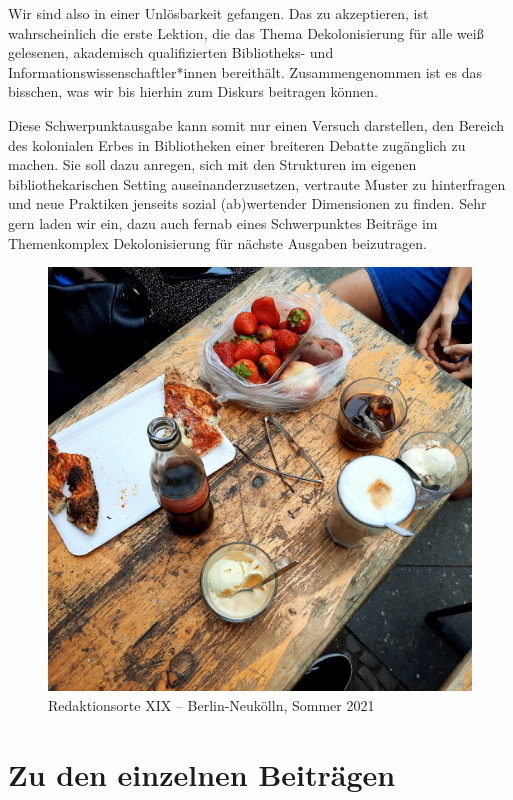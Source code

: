 \documentclass[a4paper,
fontsize=11pt,
oneside,
numbers=noperiodatend,
parskip=half-,
bibliography=totoc,
final
]{scrartcl}
\begin{document}
Wir sind also in einer Unlösbarkeit gefangen. Das zu akzeptieren, ist
wahrscheinlich die erste Lektion, die das Thema Dekolonisierung für alle
weiß gelesenen, akademisch qualifizierten Bibliotheks- und
Informationswissenschaftler*innen bereithält. Zusammengenommen ist es
das bisschen, was wir bis hierhin zum Diskurs beitragen können.

Diese Schwerpunktausgabe kann somit nur einen Versuch darstellen, den
Bereich des kolonialen Erbes in Bibliotheken einer breiteren Debatte
zugänglich zu machen. Sie soll dazu anregen, sich mit den Strukturen im
eigenen bibliothekarischen Setting auseinanderzusetzen, vertraute Muster
zu hinterfragen und neue Praktiken jenseits sozial (ab)wertender
Dimensionen zu finden. Sehr gern laden wir ein, dazu auch fernab eines
Schwerpunktes Beiträge im Themenkomplex Dekolonisierung für nächste
Ausgaben beizutragen.

\begin{figure}
\centering
\includegraphics{img/img1.jpg}
\caption{Redaktionsorte XIX -- Berlin-Neukölln, Sommer 2021}
\end{figure}

\hypertarget{zu-den-einzelnen-beitruxe4gen}{%
\section{Zu den einzelnen
Beiträgen}\label{zu-den-einzelnen-beitruxe4gen}}
\end{document}
